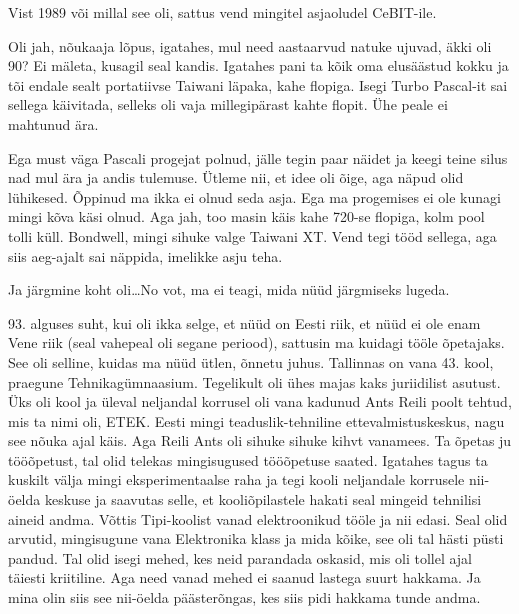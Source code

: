 Vist 1989 või millal see oli, sattus vend mingitel asjaoludel CeBIT-ile. 


Oli jah, nõukaaja lõpus, igatahes, mul need aastaarvud natuke ujuvad, äkki oli 
90? Ei mäleta, kusagil seal kandis. Igatahes pani ta kõik oma elusäästud kokku 
ja tõi endale sealt portatiivse Taiwani läpaka, kahe flopiga. Isegi Turbo 
Pascal-it sai sellega käivitada, selleks oli vaja 
millegipärast kahte flopit. Ühe peale ei mahtunud ära. 

Ega must väga Pascali progejat polnud, jälle  tegin paar näidet  
ja keegi teine silus nad mul ära ja andis tulemuse. Ütleme nii, et idee oli 
õige, aga  näpud olid lühikesed. Õppinud ma ikka ei olnud seda asja. Ega ma 
progemises ei ole kunagi mingi kõva käsi olnud. Aga jah, too masin käis kahe 
720-se flopiga,  kolm pool tolli küll. Bondwell, mingi sihuke valge Taiwani XT. 
Vend tegi tööd sellega, aga siis aeg-ajalt sai näppida, imelikke asju teha. 

Ja järgmine koht oli\ldots No vot, ma ei teagi, mida nüüd järgmiseks lugeda. 

93. alguses suht, kui oli ikka selge, et nüüd on Eesti riik, et nüüd ei ole 
enam Vene riik (seal vahepeal oli segane periood), sattusin ma kuidagi tööle 
õpetajaks. See oli selline, kuidas ma nüüd ütlen, õnnetu juhus. Tallinnas on 
vana 43. kool, praegune 
Tehnikagümnaasium\label{sisu:43kool}. 
Tegelikult oli ühes majas kaks juriidilist asutust. Üks oli kool ja  üleval 
neljandal korrusel oli vana kadunud Ants Reili poolt 
tehtud, mis ta nimi oli, ETEK. Eesti mingi teaduslik-tehniline 
ettevalmistuskeskus, nagu see nõuka ajal käis. Aga Reili Ants oli  sihuke 
sihuke kihvt vanamees. Ta õpetas ju tööõpetust, tal olid telekas mingisugused 
tööõpetuse saated. Igatahes  tagus ta kuskilt välja mingi eksperimentaalse raha 
ja tegi kooli neljandale korrusele nii-öelda keskuse ja saavutas selle, et 
kooliõpilastele hakati seal mingeid tehnilisi aineid andma. Võttis Tipi-koolist 
vanad elektroonikud  tööle ja nii edasi. Seal olid arvutid, mingisugune vana 
Elektronika klass ja mida kõike, see oli tal hästi püsti 
pandud. Tal olid isegi mehed, kes neid parandada oskasid, mis oli tollel ajal 
täiesti kriitiline. Aga need vanad mehed ei saanud lastega suurt hakkama. Ja 
mina olin siis see nii-öelda päästerõngas, kes siis pidi hakkama tunde andma. 

